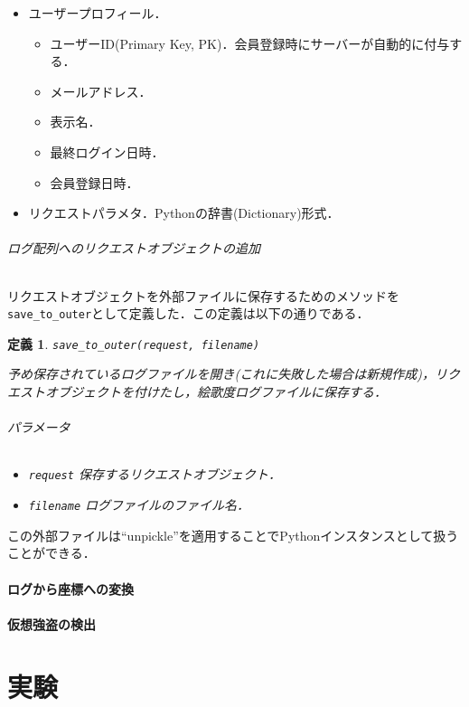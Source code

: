 \documentclass[a4paper,11pt]{jsarticle}
\newtheorem{pydef}{定義}
\newcommand{\savefunc}{{\tt save\_to\_outer}}
\newcommand{\param}{\paragraph{パラメータ}}
\begin{document}
\begin{itemize}
\item
ユーザープロフィール．
\begin{itemize}
\item
ユーザーID(Primary Key, PK)．会員登録時にサーバーが自動的に付与する．
\item
メールアドレス．
\item
表示名．
\item
最終ログイン日時．
\item
会員登録日時．
\end{itemize}
\item
リクエストパラメタ．Pythonの辞書(Dictionary)形式．
\end{itemize}

\paragraph{ログ配列へのリクエストオブジェクトの追加}
リクエストオブジェクトを外部ファイルに保存するためのメソッドを \savefunc として定義した．この定義は以下の通りである．

\begin{pydef}
\savefunc{\tt (request, filename)}

予め保存されているログファイルを開き(これに失敗した場合は新規作成)，リクエストオブジェクトを付けたし，絵歌度ログファイルに保存する．

\param
\begin{itemize}
\item
{\tt request} 保存するリクエストオブジェクト．
\item
{\tt filename} ログファイルのファイル名．
\end{itemize}

\end{pydef}



この外部ファイルは``unpickle''を適用することでPythonインスタンスとして扱うことができる．



\subsection{ログから座標への変換}

\subsection{仮想強盗の検出}

\newpage
\part{実験}
\end{document}
